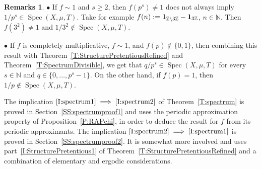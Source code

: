 \documentclass[11pt]{amsart}
\theoremstyle{definition}
\newtheorem*{remarks}{Remarks}
\newcommand{\N}{{\mathbb N}}
\newcommand{\Z}{{\mathbb Z}}
\DeclareMathOperator{\spec}{Spec}
\begin{document}
 \begin{remarks}
$\bullet$ If $f\sim 1$ and $s\geq 2$, then $f(p^s)\neq 1$ does not always imply  $1/p^s \in \spec(X,\mu,T)$. Take for example  $f(n):={\bf 1}_{\Z\setminus 3\Z}- {\bf 1}_{3\Z}$, $n\in\N$. Then $f(3^2)\neq 1$ and  $1/3^2\notin \spec(X,\mu,T)$.

 



$\bullet$ 	If   $f$  is completely multiplicative, $f\sim 1$, and  $f(p)\notin\{0,1\}$, then   combining this result with  Theorem~\ref{T:StructurePretentiousRefined} and 	Theorem~\ref{T:SpectrumDivisible},  we get   that $q/p^s\in \spec(X,\mu,T)$   for every $s\in \N$ and $q\in \{0,\ldots, p^s-1\}$.  On the other hand, if $f(p)=1$, then  $1/p\not\in\spec(X,\mu,T)$.
\end{remarks}
The implication $\eqref{I:spectrum1}\implies \eqref{I:spectrum2}$ of Theorem~\ref{T:spectrum} is proved in Section~\ref{SS:spectrumproof1}
and uses the  periodic approximation property of Proposition~\ref{P:RAPchi}, in order to deduce the result for $f$  from its periodic approximants. The implication
 $\eqref{I:spectrum2}\implies \eqref{I:spectrum1}$ is  proved in Section~\ref{SS:spectrumproof2}. It is somewhat more involved and
uses  part~\eqref{I:StructurePretentious1} of Theorem~\ref{T:StructurePretentiousRefined}   and a combination of elementary and ergodic considerations.
\end{document}
